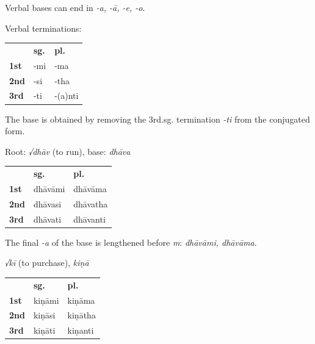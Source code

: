 \documentclass[11pt,oneside]{memoir}
\begin{document}
Verbal bases can end in \emph{-a, -ā, -e, -o}.

{\centering\par
\begin{multicols}{2}

Verbal terminations:

\begin{center}
\begin{tabular}{lll}
 & \textbf{sg.} & \textbf{pl.}\\
\textbf{1st} & -mi & -ma\\
\textbf{2nd} & -si & -tha\\
\textbf{3rd} & -ti & -(a)nti\\
\end{tabular}
\end{center}

The base is obtained by removing the 3rd.sg. termination \emph{-ti} from the conjugated form.

\columnbreak

Root: \emph{√dhāv} (to run), base: \emph{dhāva}

\begin{center}
\begin{tabular}{lll}
 & \textbf{sg.} & \textbf{pl.}\\
\textbf{1st} & dhāvāmi & dhāvāma\\
\textbf{2nd} & dhāvasi & dhāvatha\\
\textbf{3rd} & dhāvati & dhāvanti\\
\end{tabular}
\end{center}

The final \emph{-a} of the base is lengthened before \emph{m}: \emph{dhāvāmi, dhāvāma}.

\end{multicols}

\begin{multicols}{3}

\emph{√kī} (to purchase), \emph{kiṇā}

\begin{center}
\begin{tabular}{lll}
 & \textbf{sg.} & \textbf{pl.}\\
\textbf{1st} & kiṇāmi & kiṇāma\\
\textbf{2nd} & kiṇāsi & kiṇātha\\
\textbf{3rd} & kiṇāti & kiṇanti\\
\end{tabular}
\end{center}


\end{multicols}}
\end{document}
